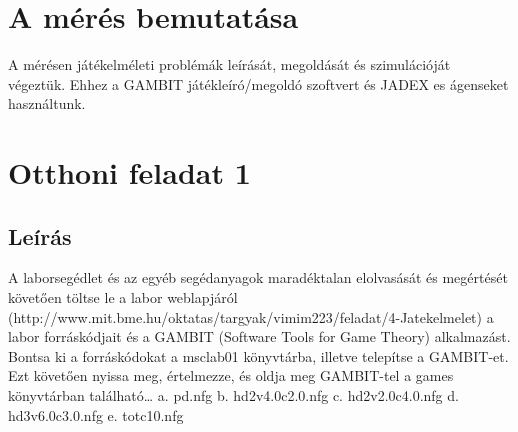 
\section{A mérés bemutatása}
A mérésen játékelméleti problémák leírását, megoldását és szimulációját végeztük. Ehhez a GAMBIT játékleíró/megoldó szoftvert és JADEX es ágenseket használtunk.

\section{Otthoni feladat 1}
\subsection{Leírás}
A laborsegédlet és az egyéb segédanyagok maradéktalan elolvasását és megértését követően töltse le a labor weblapjáról (http://www.mit.bme.hu/oktatas/targyak/vimim223/feladat/4-Jatekelmelet) a labor forráskódjait és a GAMBIT (Software Tools for Game Theory) alkalmazást. Bontsa ki a forráskódokat a msclab01 könyvtárba, illetve telepítse a GAMBIT-et. Ezt követően nyissa meg, értelmezze, és oldja meg GAMBIT-tel a games könyvtárban található… 
a. pd.nfg
b. hd2v4.0c2.0.nfg
c. hd2v2.0c4.0.nfg
d. hd3v6.0c3.0.nfg
e. totc10.nfg


